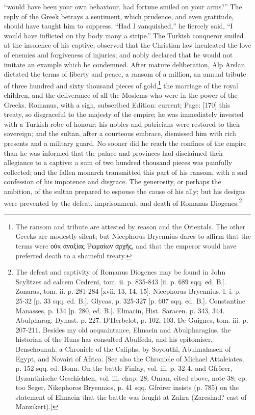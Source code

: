 \texthebrew{“}would have been your own behaviour, had fortune smiled on your arms?\texthebrew{}” The reply of the Greek betrays a sentiment, which prudence, and even gratitude, should have taught him to suppress. \texthebrew{“}Had I vanquished,\texthebrew{}” he fiercely said, \texthebrew{“}I would have inflicted on thy body many a stripe.\texthebrew{}” The Turkish conqueror smiled at the insolence of his captive; observed that the Christian law inculcated the love of enemies and forgiveness of injuries; and nobly declared that he would not imitate an example which he condemned. After mature deliberation, Alp Arslan dictated the terms of liberty and peace, a ransom of a million, an annual tribute of three hundred and sixty thousand pieces of gold,\footnote{The ransom and tribute are attested by reason and the Orientals. The other Greeks are modestly silent; but Nicephorus Bryennius dares to affirm that the terms were \textgreek{ο\texthebrew{ὐ}κ \texthebrew{ἀ}ναξίας \texthebrew{Ῥ}ωμαίων \texthebrew{ἀ}ρχ\texthebrew{ῆ}ς}, and that the emperor would have preferred death to a shameful treaty.} the marriage of the royal children, and the deliverance of all the Moslems who were in the power of the Greeks. Romanus, with a sigh, subscribed Edition: current; Page: [170] this treaty, so disgraceful to the majesty of the empire; he was immediately invested with a Turkish robe of honour; his nobles and patricians were restored to their sovereign; and the sultan, after a courteous embrace, dismissed him with rich presents and a military guard. No sooner did he reach the confines of the empire than he was informed that the palace and provinces had disclaimed their allegiance to a captive: a sum of two hundred thousand pieces was painfully collected; and the fallen monarch transmitted this part of his ransom, with a sad confession of his impotence and disgrace. The generosity, or perhaps the ambition, of the sultan prepared to espouse the cause of his ally; but his designs were prevented by the defeat, imprisonment, and death of Romanus Diogenes.\footnote{The defeat and captivity of Romanus Diogenes may be found in John Scylitzes ad calcem Cedreni, tom. ii. p. 835-843 [ii. p. 689 sqq. ed. B.]. Zonaras, tom. ii. p. 281-284 [xvii. 13, 14, 15]. Nicephorus Bryennius, l. i. p. 25-32 [p. 33 sqq. ed. B.]. Glycas, p. 325-327 [p. 607 sqq. ed. B.]. Constantine Manasses, p. 134 [p. 280, ed. B.]. Elmacin, Hist. Saracen. p. 343, 344. Abulpharag. Dynast. p. 227. D\texthebrew{}’Herbelot, p. 102, 103. De Guignes, tom. iii. p. 207-211. Besides my old acquaintance, Elmacin and Abulpharagius, the historian of the Huns has consulted Abulfeda, and his epitomiser, Benschounah, a Chronicle of the Caliphs, by Soyouthi, Abulmahasen of Egypt, and Novairi of Africa. [See also the Chronicle of Michael Attaleiates, p. 152 sqq. ed. Bonn. On the battle Finlay, vol. iii. p. 32-4, and Gfrörer, Byzantinische Geschichten, vol. iii. chap. 28; Oman, cited above, note 38; cp. too Seger, Nikephoros Bryennios, p. 41 sqq. Gfrörer insists (p. 785) on the statement of Elmacin that the battle was fought at Zahra (Zareshad? east of Manzikert).]}

